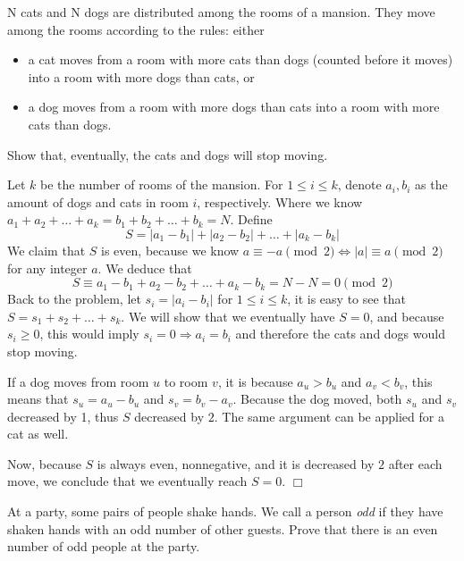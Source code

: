 \begin{problem}
    N cats and N dogs are distributed among the rooms of a mansion. They move among the rooms according to the rules: either  

    {\raggedright\begin{itemize}[topsep=2mm, itemsep=1mm]
        \item a cat moves from a room with more cats than dogs (counted before it moves) into a room with more dogs than cats, or  
        \item a dog moves from a room with more dogs than cats into a room with more cats than dogs.
    \end{itemize}}

    Show that, eventually, the cats and dogs will stop moving. 
\end{problem}

\begin{solution} 
    Let $k$ be the number of rooms of the mansion. For $1 \leq i \leq k$, denote $a_i, b_i$ as the amount of dogs and cats in room $i$, respectively. 
    Where we know $a_1 + a_2 + \ldots +a_k = b_1 + b_2 + \ldots + b_k = N $. Define
    $$S = |a_1 - b_1| + |a_2 - b_2| + \ldots + |a_k - b_k|$$
    We claim that $S$ is even, because we know $a \equiv -a \pmod 2 \iff |a| \equiv a \pmod 2$ for any integer $a$. We deduce  that 
    $$S \equiv a_1 - b_1 + a_2 - b_2 + \ldots + a_k - b_k = N - N = 0 \pmod 2$$
    Back to the problem, let $s_i = |a_i - b_i|$ for $1 \leq i \leq k$, it is easy to see that $S = s_1 + s_2 + \ldots + s_k$. We will show that we eventually have $S=0$, and because $s_i \geq 0$, this would imply $s_i=0 \Rightarrow a_i = b_i$ and therefore the cats and dogs would stop moving.

    If a dog moves from room $u$ to room $v$, it is because $a_u > b_u$ and $a_v < b_v$, this means that $s_u = a_u - b_u$ and $s_v = b_v - a_v$. Because the dog moved, both $s_u$ and $s_v$ decreased by 1, thus $S$ decreased by $2$. The same argument can be applied for a cat as well.

    Now, because $S$ is always even, nonnegative, and it is decreased by $2$ after each move, we conclude that we eventually reach $S = 0$. $\Box$
    
\end{solution}
 
\begin{problem}
    At a party, some pairs of people shake hands. We call a person \emph{odd} if they have shaken hands with an odd number of other guests. Prove that there is an even number of odd people at the party.
\end{problem}

